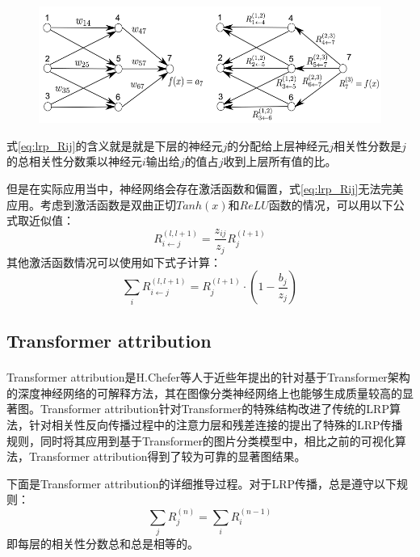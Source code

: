 \begin{figure}[!ht]
	\centering 
	\includegraphics[width=15cm]{fig/ch2/lrp4.png}
	\label{fig:lrp4}
\end{figure}

式\ref{eq:lrp_Rij}的含义就是就是下层的神经元$j$的分配给上层神经元$j$相关性分数是$j$的总相关性分数乘以神经元$i$输出给$j$的值占$j$收到上层所有值的比。

但是在实际应用当中，神经网络会存在激活函数和偏置，式\ref{eq:lrp_Rij}无法完美应用。考虑到激活函数是双曲正切$Tanh(x)$和$ReLU$函数的情况，可以用以下公式取近似值：
\begin{equation}
	R_{i \leftarrow j}^{(l, l+1)}=\frac{z_{i j}}{z_{j}} R_{j}^{(l+1)}
\end{equation}
其他激活函数情况可以使用如下式子计算：
\begin{equation}
	\sum_{i} R_{i \leftarrow j}^{(l, l+1)}=R_{j}^{(l+1)} \cdot\left(1-\frac{b_{j}}{z_{j}}\right)
\end{equation}

\subsection{Transformer attribution}
Transformer attribution是H.Chefer等人\textsuperscript{\cite{chefer2021transformer}}于近些年提出的针对基于Transformer架构的深度神经网络的可解释方法，其在图像分类神经网络上也能够生成质量较高的显著图。Transformer attribution针对Transformer的特殊结构改进了传统的LRP算法，针对相关性反向传播过程中的注意力层和残差连接的提出了特殊的LRP传播规则，同时将其应用到基于Transformer的图片分类模型中，相比之前的可视化算法，Transformer attribution得到了较为可靠的显著图结果。

下面是Transformer attribution的详细推导过程。对于LRP传播，总是遵守以下规则：
\begin{equation}
	\sum_{j} R_{j}^{(n)}=\sum_{i} R_{i}^{(n-1)}
\end{equation}
即每层的相关性分数总和总是相等的。


